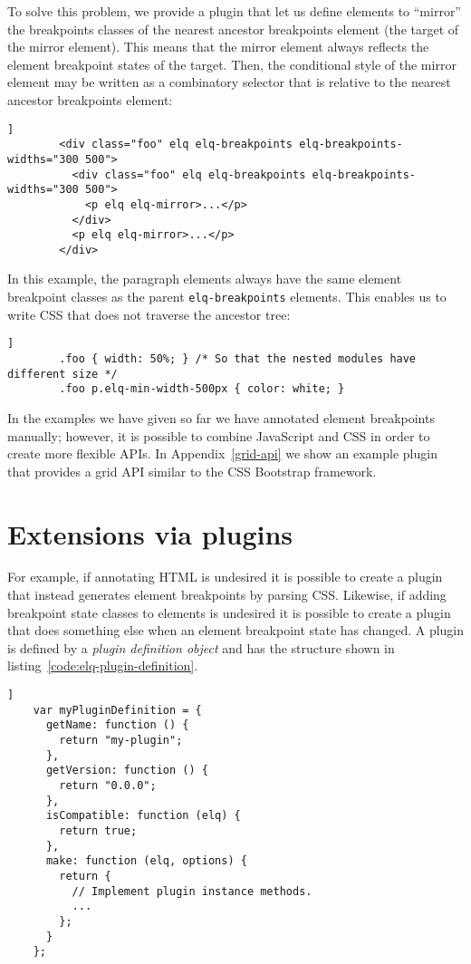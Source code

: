 \documentclass{llncs}
\newcommand{\code}[1]{\texttt{#1}}
\begin{document}
      To solve this problem, we provide a plugin that let us define elements to ``mirror'' the breakpoints classes of the nearest ancestor breakpoints element (the target of the mirror element).
      This means that the mirror element always reflects the element breakpoint states of the target.
      Then, the conditional style of the mirror element may be written as a combinatory selector that is relative to the nearest ancestor breakpoints element:

      \begin{lstlisting}[gobble=8,caption={},captionpos=b,label={}]]
        <div class="foo" elq elq-breakpoints elq-breakpoints-widths="300 500">
          <div class="foo" elq elq-breakpoints elq-breakpoints-widths="300 500">
            <p elq elq-mirror>...</p>
          </div>
          <p elq elq-mirror>...</p>
        </div>
      \end{lstlisting}

      \noindent
      In this example, the paragraph elements always have the same element breakpoint classes as the parent \code{elq-breakpoints} elements.
      This enables us to write CSS that does not traverse the ancestor tree:

      \begin{lstlisting}[gobble=8,caption={},captionpos=b,label={code:elq-mirror-example-css}]]
        .foo { width: 50%; } /* So that the nested modules have different size */
        .foo p.elq-min-width-500px { color: white; }
      \end{lstlisting}

      \noindent
      In the examples we have given so far we have annotated element breakpoints manually; however, it is possible to combine JavaScript and CSS in order to create more flexible APIs.
      In Appendix~\ref{grid-api} we show an example plugin that provides a grid API similar to the CSS Bootstrap framework.

\section{Extensions via plugins}\label{sec:plugins}
  For example, if annotating HTML is undesired it is possible to create a plugin that instead generates element breakpoints by parsing CSS.
  Likewise, if adding breakpoint state classes to elements is undesired it is possible to create a plugin that does something else when an element breakpoint state has changed.
  A plugin is defined by a \emph{plugin definition object} and has the structure shown in listing~\ref{code:elq-plugin-definition}.
  \begin{lstlisting}[gobble=4,caption={The structure of plugin definition objects.},captionpos=b,label={code:elq-plugin-definition}]]
    var myPluginDefinition = {
      getName: function () {
        return "my-plugin";
      },
      getVersion: function () {
        return "0.0.0";
      },
      isCompatible: function (elq) {
        return true;
      },
      make: function (elq, options) {
        return {
          // Implement plugin instance methods.
          ...
        };
      }
    };
  \end{lstlisting}
\end{document}
